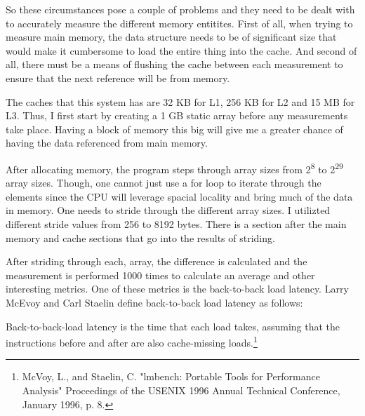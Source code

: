 \documentclass[paper=a4, fontsize=11pt]{scrartcl}
\numberwithin{equation}{section}        %
\numberwithin{figure}{section}          %
\numberwithin{table}{section}               %
\begin{document}
So these circumstances pose a couple of problems and they need to be dealt with to accurately measure the different memory entitites.  First of all, when trying to measure main memory, the data structure needs to be of significant size that would make it cumbersome to load the entire thing into the cache.  And second of all, there must be a means of flushing the cache between each measurement to ensure that the next reference will be from memory.

The caches that this system has are 32 KB for L1, 256 KB for L2 and 15 MB for L3.  Thus, I first start by creating a 1 GB static array before any measurements take place.  Having a block of memory this big will give me a greater chance of having the data referenced from main memory.



After allocating memory, the program steps through array sizes from 2\textsuperscript{8} to 2\textsuperscript{29} array sizes.  Though, one cannot just use a for loop to iterate through the elements since the CPU will leverage spacial locality and bring much of the data in memory.  One needs to stride through the different array sizes.  I utilizted different stride values from 256 to 8192 bytes.  There is a section after the main memory and cache sections that go into the results of striding.

After striding through each, array, the difference is calculated and the measurement is performed 1000 times to calculate an average and other interesting metrics.  One of these metrics is the back-to-back load latency.  Larry McEvoy and Carl Staelin define back-to-back load latency as follows:
\begin{addmargin}[1em]{2em}%
Back-to-back-load latency is the time that each load takes, assuming that the instructions before and after are also cache-missing loads.\footnote{McVoy, L., and Staelin, C.  "lmbench: Portable Tools for Performance Analysis" Proceedings of the USENIX 1996 Annual Technical Conference, January 1996, p. 8.}
\end{addmargin}
\end{document}
